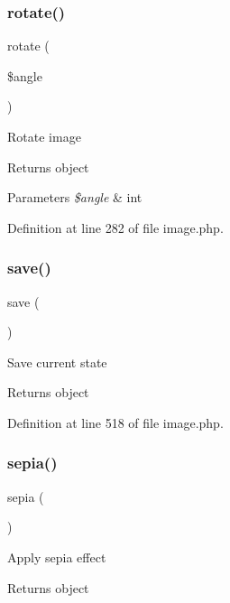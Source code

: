 \subsubsection{\texorpdfstring{rotate()}{rotate()}}
{\footnotesize\ttfamily rotate (\begin{DoxyParamCaption}\item[{}]{\$angle }\end{DoxyParamCaption})}

Rotate image \begin{DoxyReturn}{Returns}
object 
\end{DoxyReturn}

\begin{DoxyParams}{Parameters}
{\em \$angle} & int \\
\hline
\end{DoxyParams}


Definition at line 282 of file image.\+php.

\hypertarget{class_image_afc8a3c62679cf00ade9f15fb2a6d6132}{}\label{class_image_afc8a3c62679cf00ade9f15fb2a6d6132} 
\subsubsection{\texorpdfstring{save()}{save()}}
{\footnotesize\ttfamily save (\begin{DoxyParamCaption}{ }\end{DoxyParamCaption})}

Save current state \begin{DoxyReturn}{Returns}
object 
\end{DoxyReturn}


Definition at line 518 of file image.\+php.

\hypertarget{class_image_a4723159606519b101e408854bc65ee35}{}\label{class_image_a4723159606519b101e408854bc65ee35} 
\subsubsection{\texorpdfstring{sepia()}{sepia()}}
{\footnotesize\ttfamily sepia (\begin{DoxyParamCaption}{ }\end{DoxyParamCaption})}

Apply sepia effect \begin{DoxyReturn}{Returns}
object 
\end{DoxyReturn}


